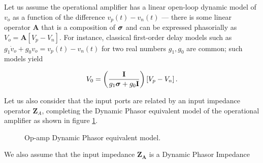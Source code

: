 	Let us assume the operational amplifier has a linear open-loop dynamic model of $v_o$ as a function of the difference $v_p(t) - v_n(t)$ — there is some linear operator $\mathbf{A}$ that is a composition of $\boldsymbol{\sigma}$ and can be expressed phasorially as $V_o = \mathbf{A}\left[V_p - V_n\right]$. For instance, classical first-order delay models such as $g_1\dot{v}_o + g_0 v_o = v_p(t) - v_n(t)$ for two real numbers $g_1,g_0$ are common; such models yield

\begin{equation} V_0 = \left(\dfrac{\mathbf{I}}{g_1 \boldsymbol{\sigma} + g_0 \mathbf{I}}\right)\left[V_p - V_n\right] .\label{eq:first_order_openloop}\end{equation}

	Let us also consider that the input ports are related by an input impedance operator $\mathbf{Z}_A$, completing the Dynamic Phasor equivalent model of the operational amplifier as shown in figure \ref{fig:amplifier_model}.

\begin{figure}[t]
\centering
{}
\caption{Op-amp Dynamic Phasor equivalent model.}
\label{fig:amplifier_model}
\end{figure} %

	We also assume that the input impedance $\mathbf{Z_A}$ is a Dynamic Phasor Impedance

